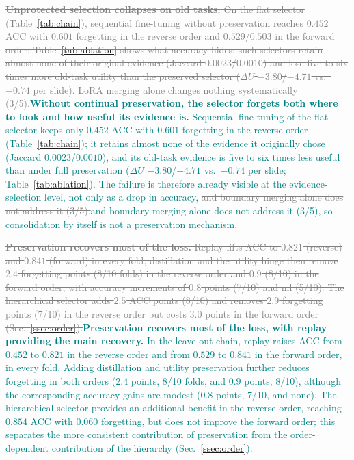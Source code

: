 \documentclass{article}
\newif\ifmarkup \markuptrue
\newcommand{\repc}[3]{\ifmarkup\textcolor{gray}{\sout{#2}}\textcolor{#1}{#3}\else#3\fi}
\newcommand{\repG}[2]{\repc{teal}{#1}{#2}}    %
\begin{document}
\repG{\textbf{Unprotected selection collapses on old tasks.} On the flat selector (Table~\ref{tab:chain}), sequential fine-tuning without preservation reaches $0.452$ ACC with $0.601$ forgetting in the reverse order and $0.529$/$0.503$ in the forward order; Table~\ref{tab:ablation} shows what accuracy hides: such selectors retain almost none of their original evidence (Jaccard $0.0023$/$0.0010$) and lose five to six times more old-task utility than the preserved selector ($\Delta U$ $-3.80$/$-4.71$ vs.\ $-0.74$ per slide). LoRA merging alone changes nothing systematically (3/5).}{\textbf{Without continual preservation, the selector forgets both where to look and how useful its evidence is.} Sequential fine-tuning of the flat selector keeps only $0.452$ ACC with $0.601$ forgetting in the reverse order (Table~\ref{tab:chain}); it retains almost none of the evidence it originally chose (Jaccard $0.0023$/$0.0010$), and its old-task evidence is five to six times less useful than under full preservation ($\Delta U$ $-3.80$/$-4.71$ vs.\ $-0.74$ per slide; Table~\ref{tab:ablation}). The failure is therefore already visible at the evidence-selection level, not only as a drop in accuracy, \repG{and boundary merging alone does not address it (3/5).}{and boundary merging alone does not address it (3/5), so consolidation by itself is not a preservation mechanism.}}

\repG{\textbf{Preservation recovers most of the loss.} Replay lifts ACC to $0.821$ (reverse) and $0.841$ (forward) in every fold; distillation and the utility hinge then remove $2.4$ forgetting points (8/10 folds) in the reverse order and $0.9$ (8/10) in the forward order, with accuracy increments of $0.8$ points (7/10) and nil (5/10). The hierarchical selector adds $2.5$ ACC points (8/10) and removes $2.9$ forgetting points (7/10) in the reverse order but costs $3.0$ points in the forward order (Sec.~\ref{ssec:order}).}{\textbf{Preservation recovers most of the loss, with replay providing the main recovery.} In the leave-out chain, replay raises ACC from $0.452$ to $0.821$ in the reverse order and from $0.529$ to $0.841$ in the forward order, in every fold. Adding distillation and utility preservation further reduces forgetting in both orders ($2.4$ points, 8/10 folds, and $0.9$ points, 8/10), although the corresponding accuracy gains are modest ($0.8$ points, 7/10, and none). The hierarchical selector provides an additional benefit in the reverse order, reaching $0.854$ ACC with $0.060$ forgetting, but does not improve the forward order; this separates the more consistent contribution of preservation from the order-dependent contribution of the hierarchy (Sec.~\ref{ssec:order}).}
\end{document}
